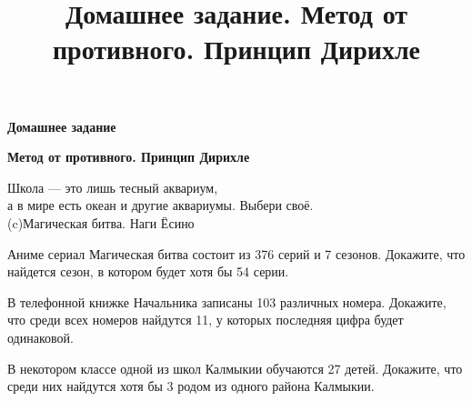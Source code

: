 \centerline{\bf \Huge Домашнее задание}
\centerline{\bf \Huge Метод от противного. Принцип Дирихле}
\title{Домашнее задание. Метод от противного. Принцип Дирихле}


\begin{flushright}
        \scriptsize{Школа — это лишь тесный аквариум, \\а в мире есть океан и другие аквариумы. Выбери своё. \\ (c)Магическая битва. Наги Ёсино}
\end{flushright}

 Аниме сериал Магическая битва состоит из 376 серий и 7 сезонов. Докажите, что найдется сезон, в котором будет хотя бы 54 серии.

 В телефонной книжке Начальника записаны 103 различных номера. Докажите, что среди всех номеров найдутся 11, у которых последняя цифра будет одинаковой.

 В некотором классе одной из школ Калмыкии обучаются 27 детей. Докажите, что среди них найдутся хотя бы 3 родом из одного района Калмыкии.